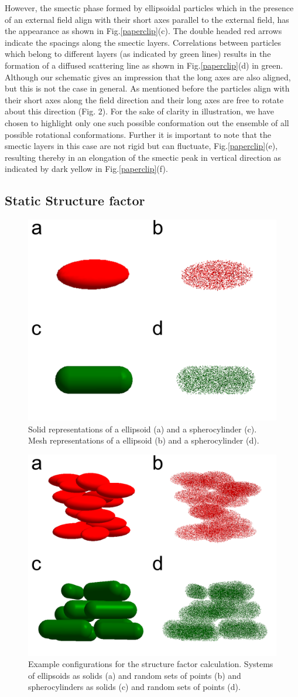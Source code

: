 \documentclass[aip,graphicx]{revtex4-1} %
\begin{document}
However, the smectic phase formed by ellipsoidal particles which in the presence of an external field align with their short axes parallel to the external
field, has the appearance as shown in Fig.\ref{paperclip}(c). The double headed red arrows indicate the spacings along the smectic layers. Correlations between
particles which belong to different layers (as indicated by green lines) results in the formation of a diffused scattering line as shown in
Fig.\ref{paperclip}(d) in green. Although our schematic gives an impression that the long axes are also aligned, but this is not the case in general. As
mentioned before the particles align with their short axes along the field direction and their long axes are free to rotate about this direction (Fig. 2). For
the sake of clarity in illustration, we have chosen to
highlight only one such possible conformation out the ensemble of all possible rotational conformations. Further it is important to note that the smectic layers
in this case are not rigid but can fluctuate, Fig.\ref{paperclip}(e), resulting thereby in an elongation of the smectic peak in vertical direction as indicated
by dark yellow in Fig.\ref{paperclip}(f).


\subsection{Static Structure factor}

\begin{figure}
    \centering
    \includegraphics[width=0.4\columnwidth]{Scatteringmodel_single.png}
    \caption{Solid representations of a ellipsoid (a) and a spherocylinder (c). Mesh representations of a ellipsoid (b) and a spherocylinder (d).}\label{fig:scatt_mod_single}
\end{figure}

\begin{figure}
    \centering
    \includegraphics[width=0.4\columnwidth]{Scatteringmodel1.png}
    \caption{Example configurations for the structure factor calculation. Systems of ellipsoids as solids (a) and random sets of points 
    (b) and spherocylinders as solids (c) and random sets of points (d).}\label{fig:scatt_mod1}
\end{figure}
\end{document}
